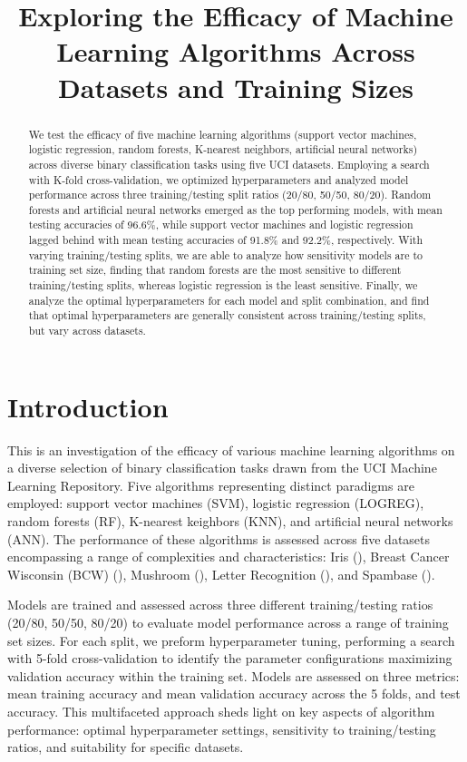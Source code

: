 \documentclass{article}
\title{Exploring the Efficacy of Machine Learning Algorithms Across Datasets and Training Sizes}
\begin{document}
\maketitle

\begin{abstract}
	We test the efficacy of five machine learning algorithms (support vector
	machines, logistic regression, random forests, K-nearest neighbors,
	artificial neural networks) across diverse binary classification tasks using
	five UCI datasets. Employing a search with K-fold cross-validation, we
	optimized hyperparameters and analyzed model performance across three
	training/testing split ratios (20/80, 50/50, 80/20). Random forests and
	artificial neural networks emerged as the top performing models, with mean
	testing accuracies of 96.6\%, while support vector machines and logistic
	regression lagged behind with mean testing accuracies of 91.8\% and 92.2\%,
	respectively. With varying training/testing splits, we are able to analyze
	how sensitivity models are to training set size, finding that random forests
	are the most sensitive to different training/testing splits, whereas logistic
	regression is the least sensitive. Finally, we analyze the optimal
	hyperparameters for each model and split combination, and find that optimal
	hyperparameters are generally consistent across training/testing splits, but
	vary across datasets.
\end{abstract}


\section{Introduction}
This is an investigation of the efficacy of various machine learning algorithms
on a diverse selection of binary classification tasks drawn from the UCI
Machine Learning Repository. Five algorithms representing distinct paradigms
are employed: support vector machines (SVM), logistic regression (LOGREG),
random forests (RF), K-nearest keighbors (KNN), and artificial neural networks
(ANN). The performance of these algorithms is assessed across five datasets
encompassing a range of complexities and characteristics: Iris (\citet{iris}),
Breast Cancer Wisconsin (BCW) (\citet{bcw}), Mushroom (\citet{mushroom}),
Letter Recognition (\citet{letter}), and Spambase (\citet{spambase}).

Models are trained and assessed across three different training/testing ratios
(20/80, 50/50, 80/20) to evaluate model performance across a range of training
set sizes. For each split, we preform hyperparameter tuning, performing a
search with 5-fold cross-validation to identify the parameter configurations
maximizing validation accuracy within the training set. Models are assessed on
three metrics: mean training accuracy and mean validation accuracy across the 5
folds, and test accuracy. This multifaceted approach sheds light on key aspects
of algorithm performance: optimal hyperparameter settings, sensitivity to
training/testing ratios, and suitability for specific datasets.
\end{document}
